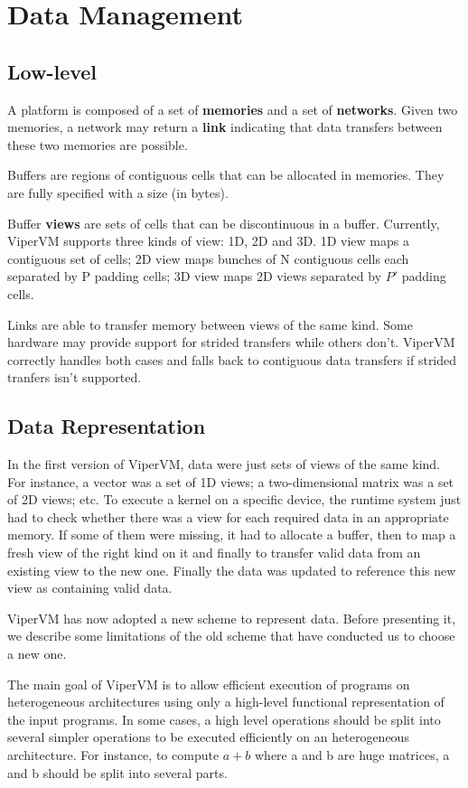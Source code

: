 \chapter{Data Management}

\section{Low-level}
A platform is composed of a set of \textbf{memories} and a set of
\textbf{networks}. Given two memories, a network may return a \textbf{link}
indicating that data transfers between these two memories are possible.

Buffers are regions of contiguous cells that can be allocated in memories. They
are fully specified with a size (in bytes).

Buffer \textbf{views} are sets of cells that can be discontinuous in a buffer.
Currently, ViperVM supports three kinds of view: 1D, 2D and 3D. 1D view maps a
contiguous set of cells; 2D view maps bunches of N contiguous cells each
separated by P padding cells; 3D view maps 2D views separated by $P'$ padding
cells.

Links are able to transfer memory between views of the same kind. Some hardware
may provide support for strided transfers while others don't. ViperVM correctly
handles both cases and falls back to contiguous data transfers if strided
tranfers isn't supported.

\section{Data Representation}
In the first version of ViperVM, data were just sets of views of the same kind.
For instance, a vector was a set of 1D views; a two-dimensional matrix was a set
of 2D views; etc. To execute a kernel on a specific device, the runtime system
just had to check whether there was a view for each required data in an
appropriate memory. If some of them were missing, it had to allocate a buffer,
then to map a fresh view of the right kind on it and finally to transfer valid data
from an existing view to the new one. Finally the data was updated to reference
this new view as containing valid data.

ViperVM has now adopted a new scheme to represent data. Before presenting it, we
describe some limitations of the old scheme that have conducted us to choose a
new one.

The main goal of ViperVM is to allow efficient execution of programs on
heterogeneous architectures using only a high-level functional representation of
the input programs. In some cases, a high level operations should be split into
several simpler operations to be executed efficiently on an heterogeneous
architecture. For instance, to compute $a+b$ where a and b are huge matrices, a
and b should be split into several parts.


